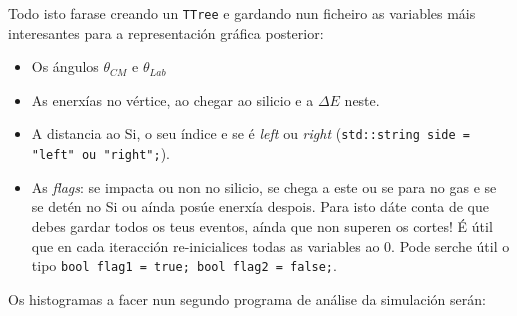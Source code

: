\documentclass[11pt, a4paper]{article}
\begin{document}
Todo isto farase creando un \lstinline{TTree} e gardando nun ficheiro as variables máis interesantes para a representación gráfica posterior:
\begin{itemize}
    \item Os ángulos $\theta_{CM}$ e $\theta_{Lab}$
    \item As enerxías no vértice, ao chegar ao silicio e a $\Delta E$ neste.
    \item A distancia ao Si, o seu índice e se é \textit{left} ou \textit{right} (\lstinline{std::string side = "left" ou "right";}).
    \item As \textit{flags}: se impacta ou non no silicio, se chega a este ou se para no gas e se se detén no Si ou aínda posúe enerxía despois. Para isto dáte conta de que debes gardar todos os teus eventos, aínda que non superen os cortes! É útil que en cada iteracción re-inicialices todas as variables ao 0. Pode serche útil o tipo \lstinline{bool flag1 = true; bool flag2 = false;}.
\end{itemize}
Os histogramas a facer nun segundo programa de análise da simulación serán:
\end{document}
